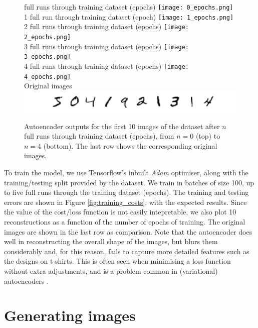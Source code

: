 \documentclass[]{article}
\begin{document}
\begin{figure}
   full runs through training dataset (epochs)
  \texttt{[image: 0\_epochs.png]} \\
  1 full run through training dataset (epoch)
  \texttt{[image: 1\_epochs.png]} \\
  2 full runs through training dataset (epochs)
  \texttt{[image: 2\_epochs.png]} \\
  3 full runs through training dataset (epochs)
  \texttt{[image: 3\_epochs.png]} \\
  4 full runs through training dataset (epochs)
  \texttt{[image: 4\_epochs.png]} \\
  Original images
  \includegraphics[scale=0.6, trim=82 0 0 0, clip]{benchmark.pdf}
  \caption{Autoencoder outputs for the first 10 images of the dataset after $n$ full runs through training dataset (epochs), from $n=0$ (top) to $n=4$ (bottom). The last row shows the corresponding original images.}
  \label{fig:training_images}
\end{figure}

\hspace{\parindent} To train the model, we use Tensorflow's inbuilt \textit{Adam} optimiser, along with the training/testing split provided by the dataset. We train in batches of size 100, up to five full runs through the training dataset (epochs). The training and testing errors are shown in Figure \ref{fig:training_costs}, with the expected results. Since the value of the cost/loss function is not easily intepretable, we also plot 10 reconstructions as a function of the number of epochs of training. The original images are shown in the last row as comparison. Note that the autoencoder does well in reconstructing the overall shape of the images, but blurs them considerably and, for this reason, fails to capture more detailed features such as the designs on t-shirts. This is often seen when minimising a loss function without extra adjustments, and is a problem common in (variational) autoencoders \cite{lamb, frans}. 




\section{Generating images}
\label{sec:generating}
\end{document}
